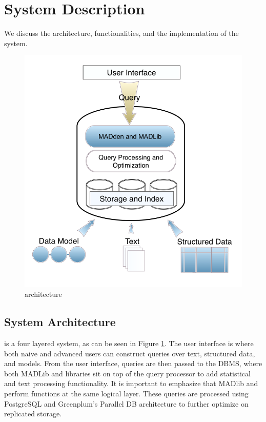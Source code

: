 
\section{System Description}

We discuss the architecture, functionalities, and the implementation of
the {\system} system.
\begin{figure}
   \begin{center}
        \includegraphics[scale=0.2]{content/graphics/arch.png}
        \caption{{\system} architecture}
        \label{fig:arch}
   \end{center}
\end{figure}
    
\subsection{System Architecture}

{\system} is a four layered system, as can be seen in Figure \ref{fig:arch}.
The user interface is where both naive and advanced users can construct queries over
text, structured data, and models. From the user interface, queries are then passed to the
DBMS, where both MADLib and {\system} libraries sit on top of the query processor to
add statistical and text processing functionality. 
It is important to emphasize that MADlib and {\system} perform functions
at the same logical layer.  These queries are processed using 
PostgreSQL and Greenplum's Parallel DB architecture to further optimize on 
replicated storage. 


